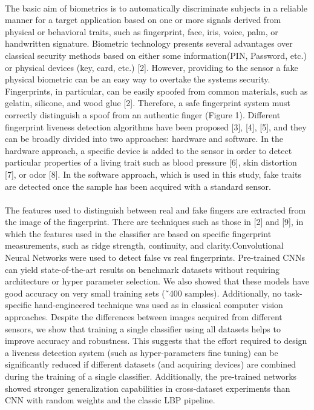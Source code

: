 \documentclass[a4paper,12pt,oneside]{article}
\begin{document}
\paragraph{}
The basic aim of biometrics is to automatically discriminate subjects in a reliable manner for a target application based on one or more signals derived from physical or behavioral traits, such as fingerprint, face, iris, voice, palm, or handwritten signature. Biometric technology presents several advantages over classical security methods based on either some information(PIN, Password, etc.) or physical devices (key, card, etc.) [2]. However, providing to the sensor a fake physical biometric can be an easy way to overtake the systems security. Fingerprints, in particular, can be easily spoofed from common materials, such as gelatin, silicone, and wood glue [2]. Therefore, a safe fingerprint system must correctly distinguish a spoof from an authentic finger (Figure 1). Different fingerprint liveness detection algorithms have been proposed [3], [4], [5], and they can be broadly divided into two approaches: hardware and software. In the hardware approach, a specific device is added to the sensor in order to detect particular properties of a living trait such as blood pressure [6], skin distortion [7], or odor [8]. In the software approach, which is used in this study, fake traits are detected once the sample has been acquired with a standard sensor.
\paragraph{}
The features used to distinguish between real and fake
fingers are extracted from the image of the fingerprint. There
are techniques such as those in [2] and [9], in which the
features used in the classifier are based on specific fingerprint
measurements, such as ridge strength, continuity, and clarity.Convolutional Neural Networks were used to detect false vs real fingerprints. Pre-trained CNNs can yield state-of-the-art results on benchmark datasets without requiring architecture or hyper parameter selection. We also showed that these models have good accuracy on very small training sets (˜400 samples). Additionally, no task-specific hand-engineered technique was used as in classical computer vision approaches. Despite the differences between images acquired from different sensors, we show that training a single classifier using all datasets helps to improve accuracy and robustness. This suggests that the effort required to design a liveness detection system (such as hyper-parameters fine tuning) can be significantly reduced if different datasets (and acquiring devices) are combined during the training of a single classifier. Additionally, the pre-trained networks showed stronger generalization capabilities in cross-dataset experiments than CNN with random weights and the classic LBP pipeline.
\end{document}
